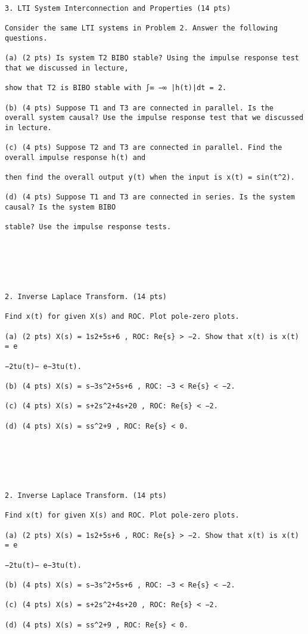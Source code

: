 \documentclass[11pt,addpoints]{exam}
\begin{document}
\begin{verbatim}
3. LTI System Interconnection and Properties (14 pts)

Consider the same LTI systems in Problem 2. Answer the following questions.

(a) (2 pts) Is system T2 BIBO stable? Using the impulse response test that we discussed in lecture,

show that T2 is BIBO stable with ∫∞ −∞ |h(t)|dt = 2.

(b) (4 pts) Suppose T1 and T3 are connected in parallel. Is the overall system causal? Use the impulse response test that we discussed in lecture.

(c) (4 pts) Suppose T2 and T3 are connected in parallel. Find the overall impulse response h(t) and

then find the overall output y(t) when the input is x(t) = sin(t^2).

(d) (4 pts) Suppose T1 and T3 are connected in series. Is the system causal? Is the system BIBO

stable? Use the impulse response tests.






2. Inverse Laplace Transform. (14 pts)

Find x(t) for given X(s) and ROC. Plot pole-zero plots.

(a) (2 pts) X(s) = 1s2+5s+6 , ROC: Re{s} > −2. Show that x(t) is x(t) = e

−2tu(t)− e−3tu(t).

(b) (4 pts) X(s) = s−3s^2+5s+6 , ROC: −3 < Re{s} < −2.

(c) (4 pts) X(s) = s+2s^2+4s+20 , ROC: Re{s} < −2.

(d) (4 pts) X(s) = ss^2+9 , ROC: Re{s} < 0.






2. Inverse Laplace Transform. (14 pts)

Find x(t) for given X(s) and ROC. Plot pole-zero plots.

(a) (2 pts) X(s) = 1s2+5s+6 , ROC: Re{s} > −2. Show that x(t) is x(t) = e

−2tu(t)− e−3tu(t).

(b) (4 pts) X(s) = s−3s^2+5s+6 , ROC: −3 < Re{s} < −2.

(c) (4 pts) X(s) = s+2s^2+4s+20 , ROC: Re{s} < −2.

(d) (4 pts) X(s) = ss^2+9 , ROC: Re{s} < 0.







\end{verbatim}
\end{document}

